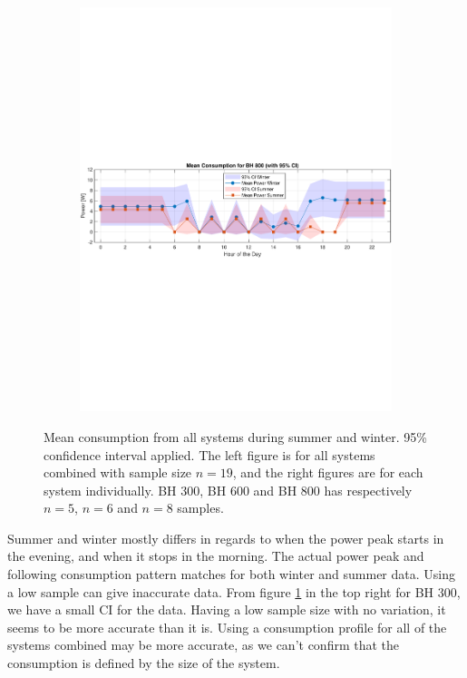 \begin{figure}[H]
\begin{minipage}[t]{0.45\linewidth}
\begin{subfigure}{\linewidth}
            \includegraphics[width=\linewidth, height=\RightImageEachHeight, keepaspectratio]{photos/Mean_consumption_winter&summer_system3_with_95CI.pdf}%
        \end{subfigure}
    \end{minipage}
    \caption{Mean consumption from all systems during summer and winter. 95\% confidence interval applied. The left figure is for all systems combined with sample size $n=19$, and the right figures are for each system individually. BH 300, BH 600 and BH 800 has respectively $n=5$, $n=6$ and $n=8$ samples.} 
    \label{result:fig:mean_power_allsystems_with95CI}
\end{figure}
Summer and winter mostly differs in regards to when the power peak starts in the evening, and when it stops in the morning. The actual power peak and following consumption pattern matches for both winter and summer data. Using a low sample can give inaccurate data. From figure \ref{result:fig:mean_power_allsystems_with95CI} in the top right for BH 300, we have a small CI for the data. Having a low sample size with no variation, it seems to be more accurate than it is. Using a consumption profile for all of the systems combined may be more accurate, as we can't confirm that the consumption is defined by the size of the system. 

